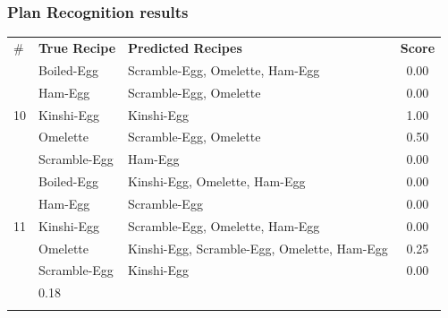 \documentclass{beamer}
\begin{document}
\begin{frame}[c]\frametitle{Plan Recognition results}
    \begin{center}
        \scriptsize
        \begin{tabular}{l|llc} 
            \hline\noalign{\smallskip}
            \#                 & \textbf{True Recipe} & \textbf{Predicted Recipes} & \textbf{Score}\\ 
            \noalign{\smallskip}\hline\hline\noalign{\smallskip}
                              & Boiled-Egg   & Scramble-Egg, Omelette, Ham-Egg              & 0.00 \\ 
                              & Ham-Egg      & Scramble-Egg, Omelette                       & 0.00 \\
            10                & Kinshi-Egg   & Kinshi-Egg                                   & 1.00 \\
                              & Omelette     & Scramble-Egg, Omelette                       & 0.50 \\
                              & Scramble-Egg & Ham-Egg                                      & 0.00 \\
            \noalign{\smallskip}\hline\hline\noalign{\smallskip}
                              & Boiled-Egg   & Kinshi-Egg, Omelette, Ham-Egg                & 0.00 \\
                              & Ham-Egg      & Scramble-Egg                                 & 0.00 \\
            11                & Kinshi-Egg   & Scramble-Egg, Omelette, Ham-Egg              & 0.00 \\
                              & Omelette     & Kinshi-Egg, Scramble-Egg, Omelette, Ham-Egg  & 0.25 \\
                              & Scramble-Egg & Kinshi-Egg                                   & 0.00 \\
            \noalign{\smallskip}\hline\hline\noalign{\smallskip}
                                                        \multicolumn{3}{r}{\textbf{Average:}} & 0.18 \\
            \noalign{\smallskip}\hline
            \end{tabular}
    \end{center}
\end{frame}
\fi
\end{document}
